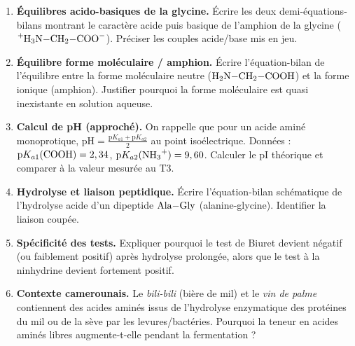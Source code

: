 \documentclass[11pt]{article}
\newcounter{popsec}
\newcounter{popsub}
\newcommand{\courssub}[1]{%
  \stepcounter{popsub}%
  \par\vspace{9pt}\noindent{\popxbold\fontsize{11.5}{13}\selectfont\color{popink}{\color{poporange}\thepopsec.\thepopsub}\hspace{6pt}#1}\par\nopagebreak\vspace{4pt}
}
\begin{document}
\courssub{Exploitation}
\begin{enumerate}
    \item \textbf{Équilibres acido-basiques de la glycine.} Écrire les deux demi-équations-bilans montrant le caractère acide puis basique de l'amphion de la glycine ($\ce{^{+}H3N-CH2-COO-}$). Préciser les couples acide/base mis en jeu.
    \item \textbf{Équilibre forme moléculaire / amphion.} Écrire l'équation-bilan de l'équilibre entre la forme moléculaire neutre ($\ce{H2N-CH2-COOH}$) et la forme ionique (amphion). Justifier pourquoi la forme moléculaire est quasi inexistante en solution aqueuse.
    \item \textbf{Calcul de pH (approché).} On rappelle que pour un acide aminé monoprotique, $\text{pH} = \frac{\text{p}K_{a1} + \text{p}K_{a2}}{2}$ au point isoélectrique. Données : $\text{p}K_{a1}(\ce{COOH}) = 2,34$, $\text{p}K_{a2}(\ce{NH3+}) = 9,60$. Calculer le pI théorique et comparer à la valeur mesurée au T3.
    \item \textbf{Hydrolyse et liaison peptidique.} Écrire l'équation-bilan schématique de l'hydrolyse acide d'un dipeptide $\ce{Ala-Gly}$ (alanine-glycine). Identifier la liaison coupée.
    \item \textbf{Spécificité des tests.} Expliquer pourquoi le test de Biuret devient négatif (ou faiblement positif) après hydrolyse prolongée, alors que le test à la ninhydrine devient fortement positif.
    \item \textbf{Contexte camerounais.} Le \emph{bili-bili} (bière de mil) et le \emph{vin de palme} contiennent des acides aminés issus de l'hydrolyse enzymatique des protéines du mil ou de la sève par les levures/bactéries. Pourquoi la teneur en acides aminés libres augmente-t-elle pendant la fermentation ?
\end{enumerate}
\end{document}
